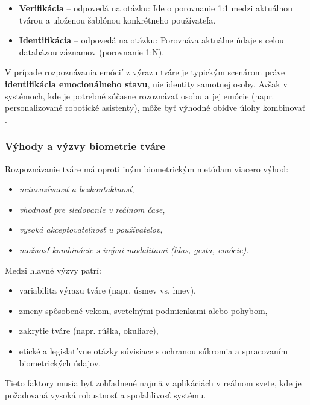 \begin{itemize}
    \item \textbf{Verifikácia} -- odpovedá na otázku:  Ide o porovnanie 1:1 medzi aktuálnou tvárou a uloženou šablónou konkrétneho používateľa.
    \item \textbf{Identifikácia} -- odpovedá na otázku:  Porovnáva aktuálne údaje s celou databázou záznamov (porovnanie 1:N).
\end{itemize}

V prípade rozpoznávania emócií z výrazu tváre je typickým scenárom práve \textbf{identifikácia emocionálneho stavu}, nie identity samotnej osoby. Avšak v systémoch, kde je potrebné súčasne rozoznávať osobu a jej emócie (napr. personalizované robotické asistenty), môže byť výhodné obidve úlohy kombinovať \cite{inProceedings01}.
\subsubsection{Výhody a výzvy biometrie tváre}

Rozpoznávanie tváre má oproti iným biometrickým metódam viacero výhod:

\begin{itemize}
    \item \emph{neinvazívnosť a bezkontaktnosť},
    \item \emph{vhodnosť pre sledovanie v reálnom čase},
    \item \emph{vysoká akceptovateľnosť u používateľov},
    \item \emph{možnosť kombinácie s inými modalitami (hlas, gesta, emócie)}.
\end{itemize}

Medzi hlavné výzvy patrí:

\begin{itemize}
    \item variabilita výrazu tváre (napr. úsmev vs. hnev),
    \item zmeny spôsobené vekom, svetelnými podmienkami alebo pohybom,
    \item zakrytie tváre (napr. rúška, okuliare),
    \item etické a legislatívne otázky súvisiace s ochranou súkromia a spracovaním biometrických údajov.
\end{itemize}

Tieto faktory musia byť zohľadnené najmä v aplikáciách v reálnom svete, kde je požadovaná vysoká robustnosť a spoľahlivosť systému.

